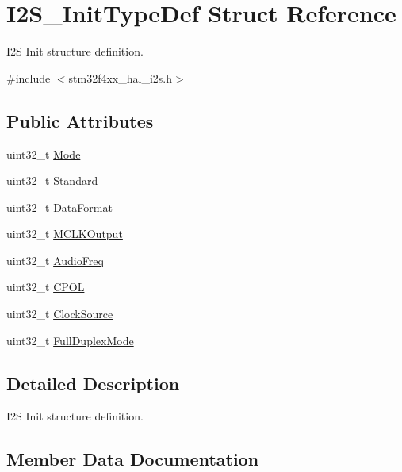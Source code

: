 \hypertarget{struct_i2_s___init_type_def}{}\section{I2\+S\+\_\+\+Init\+Type\+Def Struct Reference}
\label{struct_i2_s___init_type_def}


I2S Init structure definition.  




{\ttfamily \#include $<$stm32f4xx\+\_\+hal\+\_\+i2s.\+h$>$}

\subsection*{Public Attributes}
\begin{DoxyCompactItemize}
\item 
uint32\+\_\+t \hyperlink{struct_i2_s___init_type_def_abcd2a46537eee4ed23fa1642c5234ea8}{Mode}
\item 
uint32\+\_\+t \hyperlink{struct_i2_s___init_type_def_a8fc84bad7ae403ab4231b37077f9d99f}{Standard}
\item 
uint32\+\_\+t \hyperlink{struct_i2_s___init_type_def_aa968e67a06e23282776bd7b615a8c1cc}{Data\+Format}
\item 
uint32\+\_\+t \hyperlink{struct_i2_s___init_type_def_ad0d868889f53bdda32fa5c201efa2a12}{M\+C\+L\+K\+Output}
\item 
uint32\+\_\+t \hyperlink{struct_i2_s___init_type_def_a5c42be6d3eb4713f0d4fc202cae95553}{Audio\+Freq}
\item 
uint32\+\_\+t \hyperlink{struct_i2_s___init_type_def_aff339ae5b4099da49e6970dd59c41afe}{C\+P\+OL}
\item 
uint32\+\_\+t \hyperlink{struct_i2_s___init_type_def_a6a0c9c91b9530465cc2347c758a2fdf3}{Clock\+Source}
\item 
uint32\+\_\+t \hyperlink{struct_i2_s___init_type_def_a3126fcf92721ac72c91cc870fcef1ffe}{Full\+Duplex\+Mode}
\end{DoxyCompactItemize}


\subsection{Detailed Description}
I2S Init structure definition. 

\subsection{Member Data Documentation}

